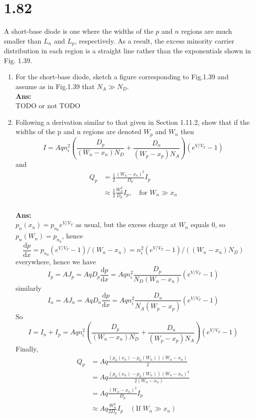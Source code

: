 \documentclass[12pt, a4paper]{article}
\newcommand{\dD}{\mathrm{d}}
\newcommand{\Ans}{{\\ \bf Ans:} \\}
\begin{document}
\section{1.82}
A short-base diode is one where the widths of the $p$ and $n$ regions are much smaller than $L_n$ and $L_p$, respectively. As a result, the excess minority carrier distribution in each region is a straight line rather than the exponentials shown in Fig. 1.39.
\begin{enumerate}[label=(\alph*)]
  \item For the short-base diode, sketch a figure corresponding to Fig.1.39 and assume as in Fig.1.39 that $N_A \gg N_D$.
    \Ans
    TODO or not TODO
  \item Following a derivation similar to that given in Section 1.11.2, show that if the widths of the p and n regions are denoted $W_p$ and $W_n$ then 
    \[
      I = Aqn_i^2 \left( \frac{D_p}{(W_n - x_n) N_D} + \frac{D_n}{(W_p - x_p) N_A} \right) \left( e^{V/V_T} - 1 \right) 
    \]
    and
    \begin{align*}
      Q_p &= \frac{1}{2} \frac{(W_n - x_n)^2}{D_p} I_p \\
          &\approx \frac{1}{2} \frac{W_n^2}{D_p}I_p, \quad \text{for } W_n \gg x_n
    \end{align*}
    \Ans
    $p_n(x_n) = p_{n_0}e^{V/V_T}$ as usual, but the excess charge at $W_n$ equals $0$, so $p_n(W_n) = p_{n_0}$, hence 
    \[
      \frac{\dD p}{\dD x} = p_{n_0} (e^{V/V_T} - 1) / (W_n - x_n) = n_i^2 (e^{V/V_T} - 1)  / ((W_n - x_n) N_D) 
    \]
    everywhere, hence we have
    \[
      I_p = A J_p = A q D_p \frac{\dD p}{\dD x} = A q n_i^2 \frac{D_p}{ N_D (W_n - x_n) } \left(e^{V/V_T} - 1\right) 
    \]
    similarly
    \[
      I_n = A J_n = A q D_n \frac{\dD p}{\dD x} = A q n_i^2 \frac{D_n}{ N_A (W_p - x_p) } \left(e^{V/V_T} - 1\right) 
    \]
    So
    \[
      I = I_n + I_p = Aqn_i^2 \left( \frac{D_p}{(W_n - x_n) N_D} + \frac{D_n}{(W_p - x_p) N_A} \right) \left( e^{V/V_T} - 1 \right) 
    \]
    Finally, 
    \begin{align*}
      Q_p &= A q \frac{(p_n(x_n) - p_n(W_n))(W_n - x_n)}{2} \\
          &= A q \frac{(p_n(x_n) - p_n(W_n))(W_n - x_n)^2}{2 (W_n - x_n)} \\
          &= A q \frac{(W_n - x_n)^2}{D_p} I_p \\
          &\approx A q \frac{W_n^2}{2 D_p} I_p \quad (\text{If } W_n \gg x_n)
    \end{align*}
      

\end{enumerate}
\end{document}
